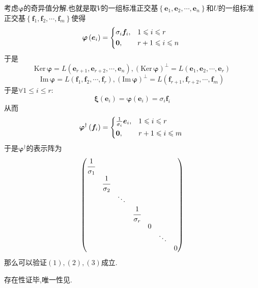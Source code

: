 \begin{formal}
\begin{Proof}
        考虑$\bm{\varphi}$的奇异值分解.也就是取$V$的一组标准正交基$\left\{
            \bm{e}_1,\bm{e}_2,\cdots,\bm{e}_n
        \right\}$和$U$的一组标准正交基$\left\{
            \bm{f}_1,\bm{f}_2,\cdots,\bm{f}_m
            \right\}$使得\[
            \bm{\varphi}\left(
                \bm{e}_i
            \right)=
            \begin{cases*}
                \sigma_i\bm{f}_i,&$1\leqslant i\leqslant r$\\
                \bm{0},&$r+1\leqslant i\leqslant n$
            \end{cases*}
            \]于是\[
            \mathrm{Ker}\,\bm{\varphi}=L\left(
                \bm{e}_{r+1},\bm{e}_{r+2},\cdots,\bm{e}_n
            \right),\left(
                \mathrm{Ker}\,\bm{\varphi}
            \right)^{\perp}=L\left(
                \bm{e}_1,\bm{e}_2,\cdots,\bm{e}_r
            \right)
            \]\[
            \mathrm{Im}\,\bm{\varphi}=L\left(
                \bm{f}_1,\bm{f}_2,\cdots,\bm{f}_r
            \right),\left(
                \mathrm{Im}\,\bm{\varphi}
            \right)^{\perp}=L\left(
                \bm{f}_{r+1},\bm{f}_{r+2},\cdots,\bm{f}_m
            \right)
            \]于是$\forall1\leqslant i\leqslant r:$\[
            \bm{\xi}\left(
                \bm{e}_i
            \right)=\bm{\varphi}\left(
                \bm{e}_i
            \right)=\sigma_i\bm{f}_i
            \]从而\[
            \bm{\varphi}^{\dagger}\left(
                \bm{f}_i
            \right)=\begin{cases*}
                \frac{1}{\sigma_i}\bm{e}_i,&$1\leqslant i\leqslant r$\\
                \bm{0},&$r+1\leqslant i\leqslant m$
            \end{cases*}
            \]于是$\bm{\varphi}^{\dagger}$的表示阵为\[
            \begin{pmatrix}
                \cfrac{1}{\sigma_1}&&&&&&\\
                &\cfrac{1}{\sigma_2}&&&&&\\
                &&\ddots&&&&\\
                &&&\cfrac{1}{\sigma_r}&&&\\
                &&&&0&&\\
                &&&&&\ddots&\\
                &&&&&&0
            \end{pmatrix}
            \]那么可以验证$(1),(2),(3)$成立.
        
        存在性证毕,唯一性见\cite{torsor3}.
        \end{Proof}
\end{formal}
